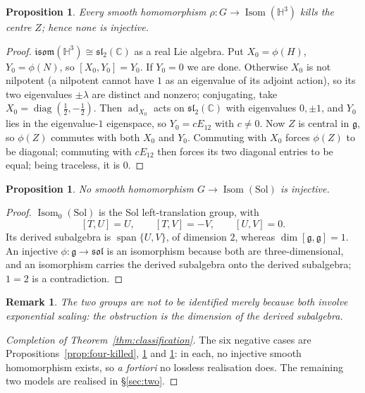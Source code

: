 \documentclass[11pt]{article}
\newtheorem{proposition}[theorem]{Proposition}
\newtheorem{remark}[theorem]{Remark}
\begin{document}
\begin{proposition}
\label{prop:h3-killed}
Every smooth homomorphism $\rho:G\to\operatorname{Isom}(\mathbb H^3)$ kills the
centre $Z$; hence none is injective.
\end{proposition}

\begin{proof}
$\mathfrak{isom}(\mathbb H^3)\cong\mathfrak{sl}_2(\mathbb C)$ as a real Lie
algebra. Put $X_0=\phi(H)$, $Y_0=\phi(N)$, so $[X_0,Y_0]=Y_0$. If $Y_0=0$ we are
done. Otherwise $X_0$ is not nilpotent (a nilpotent cannot have $1$ as an
eigenvalue of its adjoint action), so its two eigenvalues $\pm\lambda$ are
distinct and nonzero; conjugating, take $X_0=\operatorname{diag}(\tfrac12,-\tfrac12)$.
Then $\operatorname{ad}_{X_0}$ acts on $\mathfrak{sl}_2(\mathbb C)$ with
eigenvalues $0,\pm1$, and $Y_0$ lies in the eigenvalue-$1$ eigenspace, so
$Y_0=cE_{12}$ with $c\ne0$. Now $Z$ is central in $\mathfrak g$, so $\phi(Z)$
commutes with both $X_0$ and $Y_0$. Commuting with $X_0$ forces $\phi(Z)$ to be
diagonal; commuting with $cE_{12}$ then forces its two diagonal entries to be
equal; being traceless, it is $0$.
\end{proof}

\begin{proposition}
\label{prop:sol-killed}
No smooth homomorphism $G\to\operatorname{Isom}(\mathrm{Sol})$ is injective.
\end{proposition}

\begin{proof}
$\operatorname{Isom}_0(\mathrm{Sol})$ is the Sol left-translation group, with
\[
[T,U]=U,\qquad [T,V]=-V,\qquad [U,V]=0 .
\]
Its derived subalgebra is $\operatorname{span}\{U,V\}$, of dimension $2$, whereas
$\dim[\mathfrak g,\mathfrak g]=1$. An injective $\phi:\mathfrak g\to\mathfrak{sol}$
is an isomorphism because both are three-dimensional, and an isomorphism carries
the derived subalgebra onto the derived subalgebra; $1=2$ is a contradiction.
\end{proof}

\begin{remark}
The two groups are not to be identified merely because both involve exponential
scaling: the obstruction is the dimension of the derived subalgebra.
\end{remark}

\begin{proof}[Completion of Theorem~\ref{thm:classification}]
The six negative cases are Propositions~\ref{prop:four-killed},
\ref{prop:h3-killed} and \ref{prop:sol-killed}: in each, no injective smooth
homomorphism exists, so \emph{a fortiori} no lossless realisation does. The
remaining two models are realised in \S\ref{sec:two}.
\end{proof}
\end{document}
